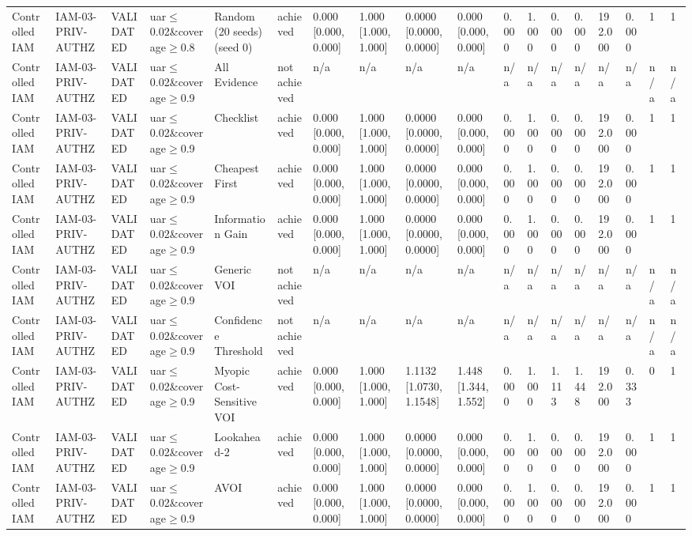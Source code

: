 \begin{table}[!ht]
{\begin{tabular}{llllllllllllllllll}
Controlled IAM & IAM-03-PRIV-AUTHZ & VALIDATED & uar$\le$0.02\&coverage$\ge$0.8 & Random (20 seeds) (seed 0) & achieved & 0.000 [0.000, 0.000] & 1.000 [1.000, 1.000] & 0.0000 [0.0000, 0.0000] & 0.000 [0.000, 0.000] & 0.000 & 1.000 & 0.000 & 0.000 & 192.000 & 0.000 & 1 & 1 \\
Controlled IAM & IAM-03-PRIV-AUTHZ & VALIDATED & uar$\le$0.02\&coverage$\ge$0.9 & All Evidence & not achieved & n/a & n/a & n/a & n/a & n/a & n/a & n/a & n/a & n/a & n/a & n/a & n/a \\
Controlled IAM & IAM-03-PRIV-AUTHZ & VALIDATED & uar$\le$0.02\&coverage$\ge$0.9 & Checklist & achieved & 0.000 [0.000, 0.000] & 1.000 [1.000, 1.000] & 0.0000 [0.0000, 0.0000] & 0.000 [0.000, 0.000] & 0.000 & 1.000 & 0.000 & 0.000 & 192.000 & 0.000 & 1 & 1 \\
Controlled IAM & IAM-03-PRIV-AUTHZ & VALIDATED & uar$\le$0.02\&coverage$\ge$0.9 & Cheapest First & achieved & 0.000 [0.000, 0.000] & 1.000 [1.000, 1.000] & 0.0000 [0.0000, 0.0000] & 0.000 [0.000, 0.000] & 0.000 & 1.000 & 0.000 & 0.000 & 192.000 & 0.000 & 1 & 1 \\
Controlled IAM & IAM-03-PRIV-AUTHZ & VALIDATED & uar$\le$0.02\&coverage$\ge$0.9 & Information Gain & achieved & 0.000 [0.000, 0.000] & 1.000 [1.000, 1.000] & 0.0000 [0.0000, 0.0000] & 0.000 [0.000, 0.000] & 0.000 & 1.000 & 0.000 & 0.000 & 192.000 & 0.000 & 1 & 1 \\
Controlled IAM & IAM-03-PRIV-AUTHZ & VALIDATED & uar$\le$0.02\&coverage$\ge$0.9 & Generic VOI & not achieved & n/a & n/a & n/a & n/a & n/a & n/a & n/a & n/a & n/a & n/a & n/a & n/a \\
Controlled IAM & IAM-03-PRIV-AUTHZ & VALIDATED & uar$\le$0.02\&coverage$\ge$0.9 & Confidence Threshold & not achieved & n/a & n/a & n/a & n/a & n/a & n/a & n/a & n/a & n/a & n/a & n/a & n/a \\
Controlled IAM & IAM-03-PRIV-AUTHZ & VALIDATED & uar$\le$0.02\&coverage$\ge$0.9 & Myopic Cost-Sensitive VOI & achieved & 0.000 [0.000, 0.000] & 1.000 [1.000, 1.000] & 1.1132 [1.0730, 1.1548] & 1.448 [1.344, 1.552] & 0.000 & 1.000 & 1.113 & 1.448 & 192.000 & 0.333 & 0 & 1 \\
Controlled IAM & IAM-03-PRIV-AUTHZ & VALIDATED & uar$\le$0.02\&coverage$\ge$0.9 & Lookahead-2 & achieved & 0.000 [0.000, 0.000] & 1.000 [1.000, 1.000] & 0.0000 [0.0000, 0.0000] & 0.000 [0.000, 0.000] & 0.000 & 1.000 & 0.000 & 0.000 & 192.000 & 0.000 & 1 & 1 \\
Controlled IAM & IAM-03-PRIV-AUTHZ & VALIDATED & uar$\le$0.02\&coverage$\ge$0.9 & AVOI & achieved & 0.000 [0.000, 0.000] & 1.000 [1.000, 1.000] & 0.0000 [0.0000, 0.0000] & 0.000 [0.000, 0.000] & 0.000 & 1.000 & 0.000 & 0.000 & 192.000 & 0.000 & 1 & 1 \\

\end{tabular}}
\end{table}
